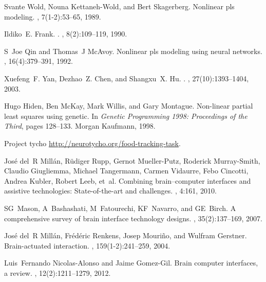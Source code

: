 \documentclass[12pt,twoside]{article}
\begin{document}
\begin{thebibliography}{10}
	Svante Wold, Nouna Kettaneh-Wold, and Bert Skagerberg.
	\newblock Nonlinear pls modeling.
	, 7(1-2):53--65,
	1989.
	
	Ildiko~E. Frank.
	.
	, 8(2):109--119,
	1990.
	
	S~Joe Qin and Thomas~J McAvoy.
	\newblock Nonlinear pls modeling using neural networks.
	, 16(4):379--391, 1992.
	
	Xuefeng~F. Yan, Dezhao~Z. Chen, and Shangxu~X. Hu.
	.
	, 27(10):1393--1404, 2003.
	
	Hugo Hiden, Ben McKay, Mark Willis, and Gary Montague.
	\newblock Non-linear partial least squares using genetic.
	\newblock In {\em Genetic Programming 1998: Proceedings of the Third}, pages
	128--133. Morgan Kaufmann, 1998.
	
	Project tycho
	\href{http://neurotycho.org/food-tracking-task}{http://neurotycho.org/food-tracking-task}.
	
	Jos{\'e} del~R Mill{\'a}n, R{\"u}diger Rupp, Gernot Mueller-Putz, Roderick
	Murray-Smith, Claudio Giugliemma, Michael Tangermann, Carmen Vidaurre, Febo
	Cincotti, Andrea Kubler, Robert Leeb, et~al.
	\newblock Combining brain--computer interfaces and assistive technologies:
	State-of-the-art and challenges.
	, 4:161, 2010.
	
	SG~Mason, A~Bashashati, M~Fatourechi, KF~Navarro, and GE~Birch.
	\newblock A comprehensive survey of brain interface technology designs.
	, 35(2):137--169, 2007.
	
	Jos{\'e} del~R Mill{\'a}n, Fr{\'e}d{\'e}ric Renkens, Josep Mouri{\~n}o, and
	Wulfram Gerstner.
	\newblock Brain-actuated interaction.
	, 159(1-2):241--259, 2004.
	
	Luis~Fernando Nicolas-Alonso and Jaime Gomez-Gil.
	\newblock Brain computer interfaces, a review.
	, 12(2):1211--1279, 2012.
	

\end{thebibliography}
\end{document}
